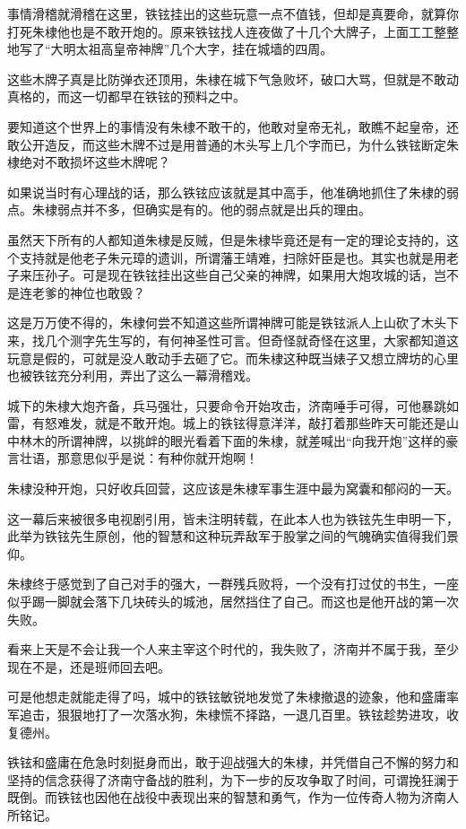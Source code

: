 \begin{multicols}{\theparacolNo}
		事情滑稽就滑稽在这里，铁铉挂出的这些玩意一点不值钱，但却是真要命，就算你打死朱棣他也是不敢开炮的。原来铁铉找人连夜做了十几个大牌子，上面工工整整地写了“大明太祖高皇帝神牌”几个大字，挂在城墙的四周。

		这些木牌子真是比防弹衣还顶用，朱棣在城下气急败坏，破口大骂，但就是不敢动真格的，而这一切都早在铁铉的预料之中。

		要知道这个世界上的事情没有朱棣不敢干的，他敢对皇帝无礼，敢瞧不起皇帝，还敢公开造反，而这些木牌不过是用普通的木头写上几个字而已，为什么铁铉断定朱棣绝对不敢损坏这些木牌呢？

		如果说当时有心理战的话，那么铁铉应该就是其中高手，他准确地抓住了朱棣的弱点。朱棣弱点并不多，但确实是有的。他的弱点就是出兵的理由。

		虽然天下所有的人都知道朱棣是反贼，但是朱棣毕竟还是有一定的理论支持的，这个支持就是他老子朱元璋的遗训，所谓藩王靖难，扫除奸臣是也。其实也就是用老子来压孙子。可是现在铁铉挂出这些自己父亲的神牌，如果用大炮攻城的话，岂不是连老爹的神位也敢毁？

		这是万万使不得的，朱棣何尝不知道这些所谓神牌可能是铁铉派人上山砍了木头下来，找几个测字先生写的，有何神圣性可言。但奇怪就奇怪在这里，大家都知道这玩意是假的，可就是没人敢动手去砸了它。而朱棣这种既当婊子又想立牌坊的心里也被铁铉充分利用，弄出了这么一幕滑稽戏。

		城下的朱棣大炮齐备，兵马强壮，只要命令开始攻击，济南唾手可得，可他暴跳如雷，有怒难发，就是不敢开炮。城上的铁铉得意洋洋，敲打着那些昨天可能还是山中林木的所谓神牌，以挑衅的眼光看着下面的朱棣，就差喊出“向我开炮”这样的豪言壮语，那意思似乎是说：有种你就开炮啊！

		朱棣没种开炮，只好收兵回营，这应该是朱棣军事生涯中最为窝囊和郁闷的一天。

		这一幕后来被很多电视剧引用，皆未注明转载，在此本人也为铁铉先生申明一下，此举为铁铉先生原创，他的智慧和这种玩弄敌军于股掌之间的气魄确实值得我们景仰。

		朱棣终于感觉到了自己对手的强大，一群残兵败将，一个没有打过仗的书生，一座似乎踢一脚就会落下几块砖头的城池，居然挡住了自己。而这也是他开战的第一次失败。

		看来上天是不会让我一个人来主宰这个时代的，我失败了，济南并不属于我，至少现在不是，还是班师回去吧。

		可是他想走就能走得了吗，城中的铁铉敏锐地发觉了朱棣撤退的迹象，他和盛庸率军追击，狠狠地打了一次落水狗，朱棣慌不择路，一退几百里。铁铉趁势进攻，收复德州。

		铁铉和盛庸在危急时刻挺身而出，敢于迎战强大的朱棣，并凭借自己不懈的努力和坚持的信念获得了济南守备战的胜利，为下一步的反攻争取了时间，可谓挽狂澜于既倒。而铁铉也因他在战役中表现出来的智慧和勇气，作为一位传奇人物为济南人所铭记。


\end{multicols}
